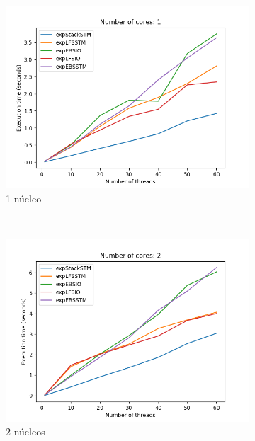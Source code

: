 \begin{figure}[H]
    \centering
    \begin{subfigure}[b]{0.49\textwidth}
        \includegraphics[width=\textwidth]{images/numberOfThreads/plots/1.png}
        \caption{1 núcleo}
        \label{subfig:numberOfThreads-1core}
    \end{subfigure}
    ~
    \begin{subfigure}[b]{0.49\textwidth}
        \includegraphics[width=\textwidth]{images/numberOfThreads/plots/2.png}
        \caption{2 núcleos}
        \label{subfig:numberOfThreads-2core}
    \end{subfigure}
    ~
    \begin{subfigure}[b]{0.5\textwidth}

\end{subfigure}
\end{figure}
